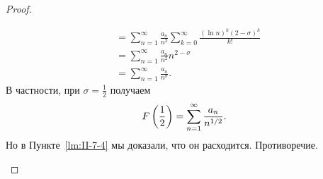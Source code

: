 \begin{proof}
\begin{casesp}
\begin{align*}
                &= \sum_{n=1}^{\infty} \frac{a_n}{n^2} \sum_{k=0}^{\infty} \frac{(\ln{n})^k (2 - \sigma)^k}{k!} \\
                &= \sum_{n=1}^{\infty} \frac{a_n}{n^2}n^{2-\sigma} \\
                &= \sum_{n=1}^{\infty} \frac{a_n}{n^\sigma}.
            \end{align*}
            В частности, при $\sigma = \frac{1}{2}$ получаем
            \[
                F\left( \frac{1}{2} \right) = \sum_{n=1}^{\infty} \frac{a_n}{n^{1 / 2}}.
            \]
            Но в Пункте~\ref{lm:II-7-4} мы доказали, что он расходится. Противоречие.
    \end{casesp}
\end{proof}
